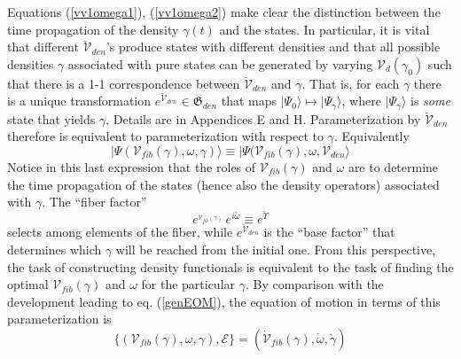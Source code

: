 \documentclass[aps,preprint]{revtex4}%
\begin{document}
Equations (\ref{vv1omega1}), (\ref{vv1omega2}) make clear the distinction
between the time propagation of the density $\gamma(t)$ and the states. In
particular, it is vital that different $\breve{\mathcal{V}}_{den}$'s produce
states with different densities and that all possible densities $\gamma$
associated with pure states can be generated by varying $\mathcal{V}%
_{d}(\gamma_{0})$ such that there is a 1-1 correspondence between
$\breve{\mathcal{V}}_{den}$ and $\gamma$. That is, for each $\gamma$ there is
a unique transformation $e^{\breve{\mathcal{V}}_{den}}\in\mathfrak{G}_{den}$
that maps $|\Psi_{0}\rangle\mapsto|\Psi_{\gamma}\rangle$, where $|\Psi
_{\gamma}\rangle$ is \emph{some} state that yields $\gamma$. Details are in
Appendices E and H. Parameterization by $\breve{\mathcal{V}}_{den}$ therefore
is equivalent to parameterization with respect to $\gamma$. Equivalently
\begin{equation}
|\Psi(\mathcal{V}_{fib}(\gamma),\omega,\gamma)\rangle\equiv|\Psi
(\mathcal{V}_{fib}(\gamma),\omega,\mathcal{V}_{den}\rangle
\end{equation}
Notice in this last expression that the roles of $\mathcal{V}_{fib}(\gamma)$
and $\omega$ are to determine the time propagation of the states (hence also
the density operators) associated with $\gamma$. The ``fiber factor''
\begin{equation}
e^{_{\mathcal{\breve{V}}_{fib}(\gamma)}}\,e^{i\breve{\omega}}\equiv
e^{\breve{\Upsilon}} \label{fiberfactor}%
\end{equation}
selects among elements of the fiber, while $e^{\breve{\mathcal{V}}_{den}}$ is
the ``base factor'' that determines which $\gamma$ will be reached from the
initial one. From this perspective, the task of constructing density
functionals is equivalent to the task of finding the optimal $\mathcal{V}%
_{fib}(\gamma)$ and $\omega$ for the particular $\gamma$. By comparison with
the development leading to eq. (\ref{genEOM}), the equation of motion in terms
of this parameterization is
\begin{equation}
\{(\mathcal{V}_{fib}(\gamma),\omega,\gamma),\mathcal{E}\}=(\mathcal{\dot{V}%
}_{fib}(\gamma),\dot{\omega},\dot{\gamma}) \label{Vomegagammaeom}%
\end{equation}
\end{document}
